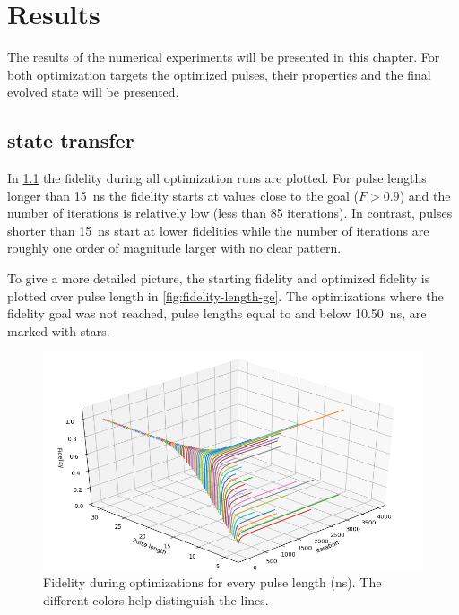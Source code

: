 \documentclass[main.tex]{subfiles}
\begin{document}
\chapter{Results}
The results of the numerical experiments will be presented in this chapter.
For both optimization targets the optimized pulses, their properties and the final evolved state will be presented.


\section{\texorpdfstring{}{0 -> 1} state transfer}
In \cref{fig:3d-optim-ge} the fidelity during all optimization runs are plotted.
For pulse lengths longer than \SI{15}{\nano\second} the fidelity starts at values close to the goal (\(F>0.9\)) and the number of iterations is relatively low (less than 85 iterations).
In contrast, pulses shorter than \SI{15}{\nano\second} start at lower fidelities while the number of iterations are roughly one order of magnitude larger with no clear pattern.

To give a more detailed picture, the starting fidelity and optimized fidelity is plotted over pulse length in \cref{fig:fidelity-length-ge}.
The optimizations where the fidelity goal was not reached, pulse lengths equal to and below \SI{10.50}{\nano\second}, are marked with stars.

\begin{figure}
    \centering
    \includegraphics[width=\linewidth]{figs/3d-optim-ge.png}
    \caption{Fidelity during optimizations for every pulse length (ns). The different colors help distinguish the lines.}\label{fig:3d-optim-ge}
\end{figure}
\end{document}
